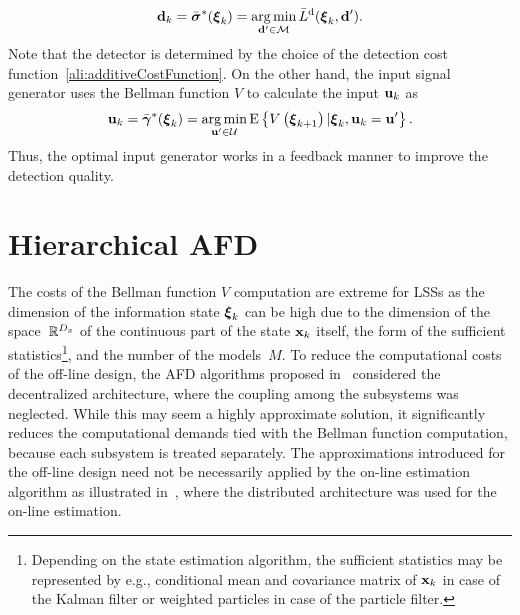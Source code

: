 \documentclass[conference,10pt]{IEEEtran}
\def\nth{\prescript{n\!}{}}
\begin{document}
\begin{align}\label{ali:optimalDecision}
	\mathbf{d}_{k} = \bar{\boldsymbol{\sigma}}^{*}(\boldsymbol{\xi}_{k}) = \operatorname*{arg\,min}_{\mathbf{d}'\in\mathcal{M}} \bar{L}^{\mathrm{d}}(\boldsymbol{\xi}_{k},\mathbf{d}').
\end{align}
Note that the detector is determined by the choice of the detection cost function~\eqref{ali:additiveCostFunction}. 
On the other hand, the input signal generator uses the Bellman function $V$ to calculate the input $\mathbf{u}_k$ as
\begin{align}\label{ali:optimalInput}
	\mathbf{u}_{k} = \bar{\boldsymbol{\gamma}}^{*}(\boldsymbol{\xi}_{k}) = 	\operatorname*{arg\,min}_{\mathbf{u}'\in\mathcal{U}} \operatorname*{E} \left\{ V \left( \boldsymbol{\xi}_{k+1}\right) \vert \boldsymbol{\xi}_{k},\mathbf{u}_k=\mathbf{u}' \right\}.
\end{align}
Thus, the optimal input generator works in a feedback manner to improve the detection quality.  
\section{Hierarchical AFD}\label{sec:hierarchical_afd}
The costs of the Bellman function $V$  computation are extreme for LSSs as the dimension of the information state $\boldsymbol{\xi}_{k}$ can be high due to the dimension of the space~$\mathbb{R}^{D_x}$  of the continuous part of the state $\mathbf{x}_k$ itself, the form of the sufficient statistics\footnote{Depending on the state estimation algorithm, the sufficient statistics may be represented by e.g., conditional mean and covariance matrix of $\mathbf{x}_k$ in case of the Kalman filter  or weighted particles in case of the particle filter.}, and the number of the models~$M$. 
To reduce the computational costs of the off-line design, the AFD algorithms proposed in~\cite{Puncochar2019:cp:ACC,Straka2019:cp:FUSION} considered the decentralized architecture, where the coupling among the subsystems was neglected.
While this may seem a highly approximate solution, it significantly reduces the computational demands tied with the Bellman function computation, because each subsystem is treated separately.
The approximations introduced for the off-line design need not be necessarily applied by the on-line estimation algorithm as illustrated in~\cite{Straka2019:cp:FUSION}, where the distributed architecture was used for the on-line estimation.
\end{document}
